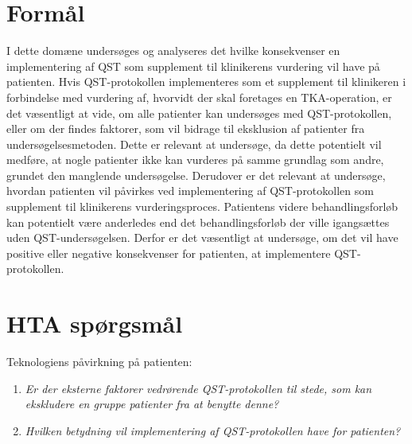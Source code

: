 \section{Formål}
I dette domæne undersøges og analyseres det hvilke konsekvenser en implementering af QST som supplement til klinikerens vurdering vil have på patienten. Hvis QST-protokollen implementeres som et supplement til klinikeren i forbindelse med vurdering af, hvorvidt der skal foretages en TKA-operation, er det væsentligt at vide, om alle patienter kan undersøges med QST-protokollen, eller om der findes faktorer, som vil bidrage til eksklusion af patienter fra undersøgelsesmetoden. Dette er relevant at undersøge, da dette potentielt vil medføre, at nogle patienter ikke kan vurderes på samme grundlag som andre, grundet den manglende undersøgelse. Derudover er det relevant at undersøge, hvordan patienten vil påvirkes ved implementering af QST-protokollen som supplement til klinikerens vurderingsproces. Patientens videre behandlingsforløb kan potentielt være anderledes end det behandlingsforløb der ville igangsættes uden QST-undersøgelsen. Derfor er det væsentligt at undersøge, om det vil have positive eller negative konsekvenser for patienten, at implementere QST-protokollen.
 
\section{HTA spørgsmål}
Teknologiens påvirkning på patienten:
\begin{enumerate}
\item \textit{Er der eksterne faktorer vedrørende QST-protokollen til stede, som kan  ekskludere en gruppe patienter fra at benytte denne?} %
\item \textit{Hvilken betydning vil implementering af QST-protokollen have for patienten?} %
\end{enumerate}

